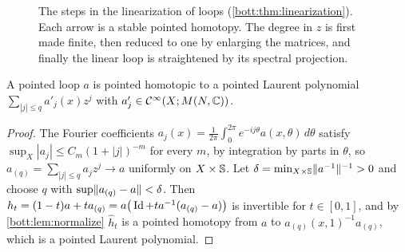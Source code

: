 \begin{figure}[ht]
\centering
{}
\caption{The steps in the linearization of loops
(\cref{bott:thm:linearization}). Each arrow is a stable pointed homotopy. The
degree in $z$ is first made finite, then reduced to one by enlarging the
matrices, and finally the linear loop is straightened by its spectral projection.}
\label{bott:fig:linearization}
\end{figure}

\begin{lemma}\label{bott:lem:laurent}
  A pointed loop $a$ is pointed homotopic to a pointed Laurent polynomial
  $\sum_{|j|\le q}a'_j(x)z^j$ with $a'_j\in\mathcal{C}^\infty(X;M(N,\mathbb{C}))$.
\end{lemma}
\begin{proof}
  The Fourier coefficients $a_j(x)=\frac1{2\pi}\int_0^{2\pi}e^{-ij\theta}a(x,\theta)\,d\theta$
  satisfy $\sup_X|a_j|\le C_m(1+|j|)^{-m}$ for every $m$, by integration by parts
  in $\theta$, so $a_{(q)}=\sum_{|j|\le q}a_jz^j\to a$ uniformly on $X\times\mathbb{S}$.
  Let $\delta=\min_{X\times\mathbb{S}}\lVert a^{-1}\rVert^{-1}>0$ and choose $q$ with
  $\sup\lVert a_{(q)}-a\rVert<\delta$. Then
  $h_t=(1-t)a+ta_{(q)}=a\big(\operatorname{Id}+ta^{-1}(a_{(q)}-a)\big)$ is invertible for
  $t\in[0,1]$, and by \cref{bott:lem:normalize} $\hat h_t$ is a pointed homotopy
  from $a$ to $a_{(q)}(x,1)^{-1}a_{(q)}$, which is a pointed Laurent polynomial.
\end{proof}

